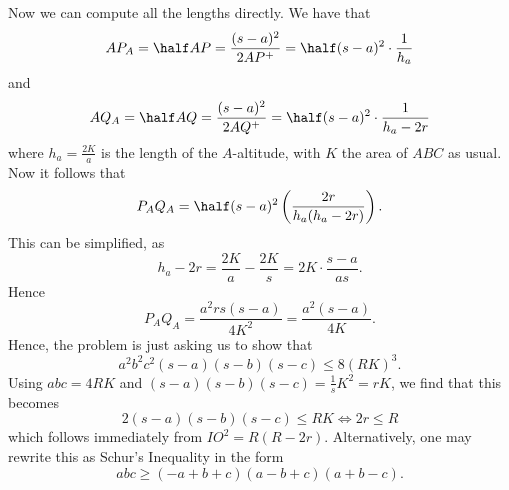 \documentclass[11pt]{scrartcl}
\begin{document}
Now we can compute all the lengths directly.  We have that
\[ AP_A = \half AP = \frac{(s-a)^2}{2AP^+}
= \half (s-a)^2 \cdot \frac{1}{h_a} \]
and
\[ AQ_A = \half AQ = \frac{(s-a)^2}{2AQ^+}
= \half (s-a)^2 \cdot \frac{1}{h_a-2r} \]
where $h_a = \frac{2K}{a}$ is the length of the $A$-altitude, with $K$ the area of $ABC$ as usual. Now it follows that
\[ P_AQ_A = \half (s-a)^2 \left( \frac{2r}{h_a(h_a-2r)} \right). \]
This can be simplified, as
\[ h_a - 2r = \frac{2K}{a} - \frac{2K}{s} = 2K \cdot \frac{s-a}{as}. \]
Hence
\[ P_AQ_A = \frac{a^2rs(s-a)}{4K^2} = \frac{a^2(s-a)}{4K}. \]
Hence, the problem is just asking us to show that
\[ a^2b^2c^2(s-a)(s-b)(s-c) \le 8 (RK)^3. \]
Using $abc=4RK$ and $(s-a)(s-b)(s-c) = \frac 1s K^2 = rK$, we find that this becomes
\[ 2(s-a)(s-b)(s-c) \le RK \iff 2r \le R \]
which follows immediately from $IO^2=R(R-2r)$.
Alternatively, one may rewrite this as Schur's Inequality in the form
\[ abc \ge (-a+b+c)(a-b+c)(a+b-c). \]
\pagebreak
\end{document}

